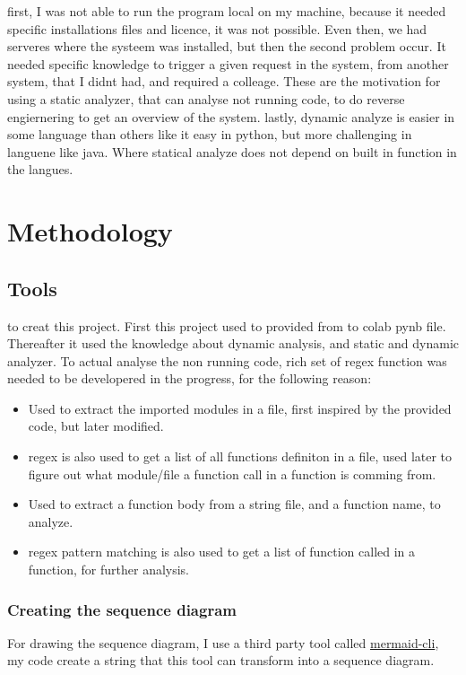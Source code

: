 \documentclass[12pt,a4paper]{report}
\begin{document}
    first, I was not able to run the program local on my machine, because it needed specific installations files and licence, it was not possible. Even then, we had serveres where the systeem was installed, but then the second problem occur. It needed specific knowledge to trigger a given request in the system, from another system, that I didnt had, and required a colleage. These are the motivation for using a static analyzer, that can analyse not running code, to do reverse engiernering to get an overview of the system. lastly, dynamic analyze is easier in some language than others like it easy in python, but more challenging in languene like java. Where statical analyze does not depend on built in function in the langues.


    \chapter{Methodology}
    
    \section{Tools}
    to creat this project. First this project used to provided from to colab pynb file. Thereafter it used the knowledge about dynamic analysis, and static and dynamic analyzer. To actual analyse the non running code, rich set of regex function was needed to be developered in the progress, for the following reason: 
    \begin{itemize}
        \item Used to extract the imported modules in a file, first inspired by the provided code, but later modified. 
        \item regex is also used to get a list of all functions definiton in a file, used later to figure out what module/file a function call in a function is comming from. 
        \item Used to extract a function body from a string file, and a function name, to analyze. 
        \item regex pattern matching is also used to get a list of function called in a function, for further analysis. 
    \end{itemize}
    
    \subsection{Creating the sequence diagram}
    For drawing the sequence diagram, I use a third party tool called 
     \href{https://github.com/mermaid-js/mermaid-cli}{mermaid-cli}, my code create a string that this tool can transform into a sequence diagram. 
\end{document}
